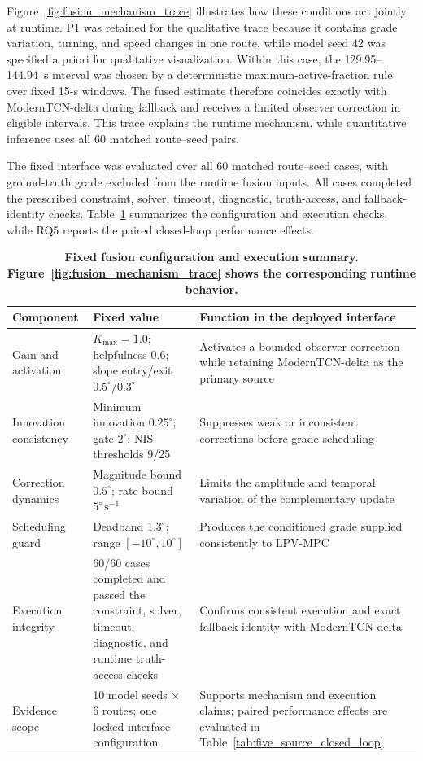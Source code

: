 \documentclass{ieeeaccess}
\begin{document}
Figure~\ref{fig:fusion_mechanism_trace} illustrates how these conditions act
jointly at runtime. P1 was retained for the qualitative trace because it
contains grade variation, turning, and speed changes in one route, while model
seed 42 was specified a priori for qualitative visualization. Within this
case, the 129.95--144.94~s interval was chosen by a deterministic
maximum-active-fraction rule over fixed 15-s windows. The fused estimate
therefore coincides exactly with ModernTCN-delta during fallback and receives a
limited observer correction in eligible intervals. This trace explains the
runtime mechanism, while quantitative inference uses all 60 matched
route--seed pairs.

The fixed interface was evaluated over all 60 matched route--seed cases, with
ground-truth grade excluded from the runtime fusion inputs. All cases completed
the prescribed constraint, solver, timeout, diagnostic, truth-access, and
fallback-identity checks. Table~\ref{tab:observer_fusion_evidence} summarizes
the configuration and execution checks, while RQ5 reports the paired
closed-loop performance effects.

\begin{table}[!t]
\centering
\caption{\textbf{Fixed fusion configuration and execution summary. Figure~\ref{fig:fusion_mechanism_trace} shows the corresponding runtime behavior.}}
\label{tab:observer_fusion_evidence}
\scriptsize
\setlength{\tabcolsep}{3.2pt}
\begin{tabular}{|p{}|p{}|p{}|}
\hline
Component & Fixed value & Function in the deployed interface \\
\hline
Gain and activation
& $K_{\max}=1.0$; helpfulness 0.6; slope entry/exit $0.5^{\circ}/0.3^{\circ}$
& Activates a bounded observer correction while retaining ModernTCN-delta as the primary source \\
Innovation consistency
& Minimum innovation $0.25^{\circ}$; gate $2^{\circ}$; NIS thresholds 9/25
& Suppresses weak or inconsistent corrections before grade scheduling \\
Correction dynamics
& Magnitude bound $0.5^{\circ}$; rate bound $5^{\circ}\,\mathrm{s}^{-1}$
& Limits the amplitude and temporal variation of the complementary update \\
Scheduling guard
& Deadband $1.3^{\circ}$; range $[-10^{\circ},10^{\circ}]$
& Produces the conditioned grade supplied consistently to LPV-MPC \\
Execution integrity
& 60/60 cases completed and passed the constraint, solver, timeout, diagnostic, and runtime truth-access checks
& Confirms consistent execution and exact fallback identity with ModernTCN-delta \\
Evidence scope
& 10 model seeds $\times$ 6 routes; one locked interface configuration
& Supports mechanism and execution claims; paired performance effects are evaluated in Table~\ref{tab:five_source_closed_loop} \\
\hline
\end{tabular}
\end{table}
\end{document}
